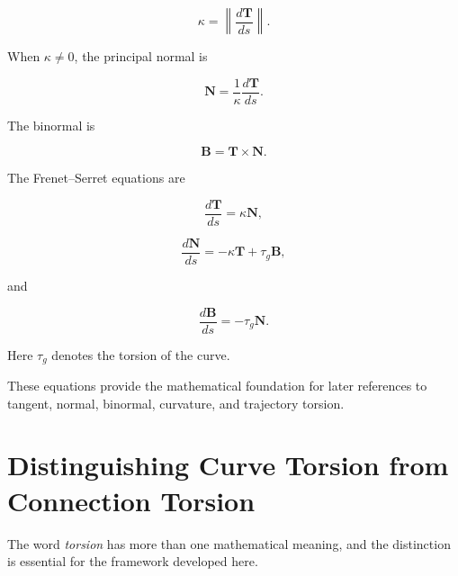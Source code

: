 \documentclass[12pt,oneside]{book}
\begin{document}
\begin{equation}
    \kappa
    =
    \left\|
        \frac{d\mathbf{T}}{ds}
    \right\|.
    \label{eq:frenet-curvature}
\end{equation}

When \(\kappa\neq0\), the principal normal is

\begin{equation}
    \mathbf{N}
    =
    \frac{1}{\kappa}
    \frac{d\mathbf{T}}{ds}.
    \label{eq:frenet-normal}
\end{equation}

The binormal is

\begin{equation}
    \mathbf{B}
    =
    \mathbf{T}
    \times
    \mathbf{N}.
    \label{eq:frenet-binormal}
\end{equation}

The Frenet--Serret equations are

\begin{equation}
    \frac{d\mathbf{T}}{ds}
    =
    \kappa\mathbf{N},
    \label{eq:frenet-serret-one}
\end{equation}

\begin{equation}
    \frac{d\mathbf{N}}{ds}
    =
    -\kappa\mathbf{T}
    +
    \tau_g\mathbf{B},
    \label{eq:frenet-serret-two}
\end{equation}

and

\begin{equation}
    \frac{d\mathbf{B}}{ds}
    =
    -\tau_g\mathbf{N}.
    \label{eq:frenet-serret-three}
\end{equation}

Here \(\tau_g\) denotes the torsion of the curve.

These equations provide the mathematical foundation for later
references to tangent, normal, binormal, curvature, and
trajectory torsion.


\section{Distinguishing Curve Torsion from Connection Torsion}
\label{sec:torsion-distinction}

The word \emph{torsion} has more than one mathematical meaning,
and the distinction is essential for the framework developed
here.
\end{document}
